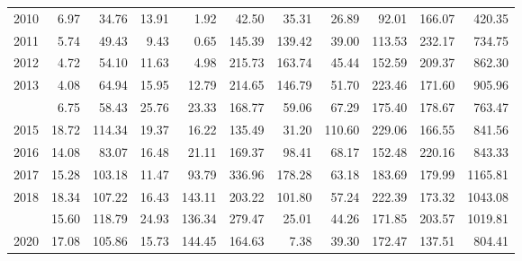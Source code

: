 \begin{longtable}[t]{rrrrrrrrrrr}
2010 & 6.97 & 34.76 & 13.91 & 1.92 & 42.50 & 35.31 & 26.89 & 92.01 & 166.07 & 420.35\\
2011 & 5.74 & 49.43 & 9.43 & 0.65 & 145.39 & 139.42 & 39.00 & 113.53 & 232.17 & 734.75\\
2012 & 4.72 & 54.10 & 11.63 & 4.98 & 215.73 & 163.74 & 45.44 & 152.59 & 209.37 & 862.30\\
2013 & 4.08 & 64.94 & 15.95 & 12.79 & 214.65 & 146.79 & 51.70 & 223.46 & 171.60 & 905.96\\
\addlinespace
2014 & 6.75 & 58.43 & 25.76 & 23.33 & 168.77 & 59.06 & 67.29 & 175.40 & 178.67 & 763.47\\
2015 & 18.72 & 114.34 & 19.37 & 16.22 & 135.49 & 31.20 & 110.60 & 229.06 & 166.55 & 841.56\\
2016 & 14.08 & 83.07 & 16.48 & 21.11 & 169.37 & 98.41 & 68.17 & 152.48 & 220.16 & 843.33\\
2017 & 15.28 & 103.18 & 11.47 & 93.79 & 336.96 & 178.28 & 63.18 & 183.69 & 179.99 & 1165.81\\
2018 & 18.34 & 107.22 & 16.43 & 143.11 & 203.22 & 101.80 & 57.24 & 222.39 & 173.32 & 1043.08\\
\addlinespace
2019 & 15.60 & 118.79 & 24.93 & 136.34 & 279.47 & 25.01 & 44.26 & 171.85 & 203.57 & 1019.81\\
2020 & 17.08 & 105.86 & 15.73 & 144.45 & 164.63 & 7.38 & 39.30 & 172.47 & 137.51 & 804.41\\*
\end{longtable}
